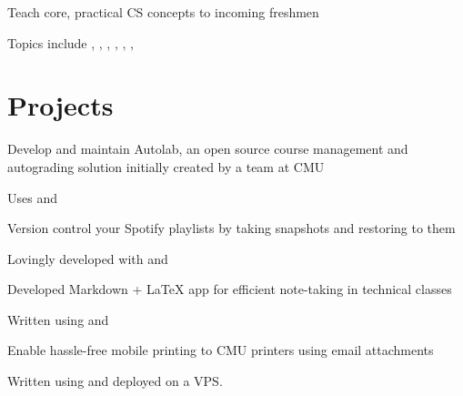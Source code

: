 \documentclass[]{deedy-resume-openfont}
\begin{document}
\begin{minipage}[t]{0.66\textwidth}
\begin{tightemize}
\item Teach core, practical CS concepts to incoming freshmen
\item Topics include , ,
  , , , ,
\end{tightemize}
\sectionsep


\section{Projects}
\descript{}
\begin{tightemize}
\item Develop and maintain Autolab, an open source course management and
  autograding solution initially created by a team at CMU
\item Uses  and 
\end{tightemize}
\sectionsep

\descript{}
\begin{tightemize}
\item Version control your Spotify playlists by taking snapshots and restoring
  to them
\item Lovingly developed with  and 
\end{tightemize}
\sectionsep

\descript{}
\begin{tightemize}
\item Developed Markdown + \LaTeX{} app for efficient note-taking in technical
  classes
\item Written using  and 
\end{tightemize}
\sectionsep

\descript{}
\begin{tightemize}
\item Enable hassle-free mobile printing to CMU printers using email attachments
\item Written using  and  deployed on a
   VPS.
\end{tightemize}
\sectionsep



\end{minipage}
\end{document}
